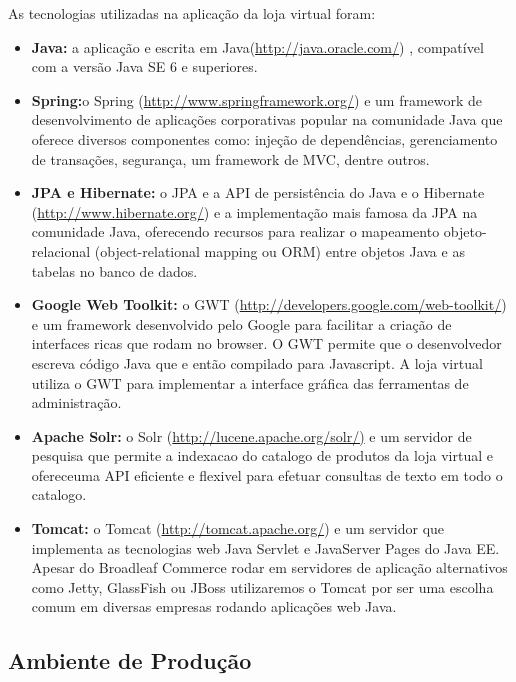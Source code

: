 As tecnologias utilizadas na aplicação da loja virtual foram:

\begin{itemize}

\item \textbf{Java:} a aplicação e escrita em Java(\url{http://java.oracle.com/}) , compatível
com a versão Java SE 6 e superiores.

\item \textbf{Spring:}o Spring (\url{http://www.springframework.org/}) e um framework
de desenvolvimento de aplicações corporativas popular na comunidade
Java que oferece diversos componentes como: injeção de dependências,
gerenciamento de transações, segurança, um framework de MVC, dentre
outros.

\item \textbf{JPA e Hibernate:} o JPA e a API de persistência do Java e o Hibernate
(\url{http://www.hibernate.org/}) e a implementação mais famosa da
JPA na comunidade Java, oferecendo recursos para realizar o mapeamento
objeto-relacional (object-relational mapping ou ORM) entre objetos
Java e as tabelas no banco de dados.

\item \textbf{Google Web Toolkit:} o GWT (\url{http://developers.google.com/web-toolkit/}) e um framework desenvolvido pelo Google para facilitar
a criação de interfaces ricas que rodam no browser. O GWT permite
que o desenvolvedor escreva código Java que e então compilado para
Javascript. A loja virtual utiliza o GWT para implementar a interface
gráfica das ferramentas de administração.

\item \textbf{Apache Solr:} o Solr (\url{http://lucene.apache.org/solr/)} e um servidor de
pesquisa que permite a indexacao do catalogo de produtos da loja virtual
e ofereceuma API eficiente e flexivel para efetuar consultas de texto
em todo o catalogo.

\item \textbf{Tomcat:} o Tomcat (\url{http://tomcat.apache.org/}) e um servidor que implementa
as tecnologias web  Java Servlet e JavaServer Pages  do Java
EE. Apesar do Broadleaf Commerce rodar em servidores de aplicação
alternativos  como Jetty, GlassFish ou JBoss  utilizaremos o Tomcat
por ser uma escolha comum em diversas empresas rodando aplicações
web Java.

\end{itemize}

\subsection{Ambiente de Produção}

